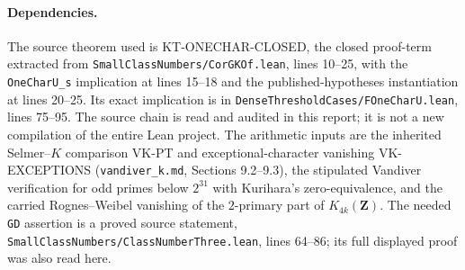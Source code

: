 \paragraph{Dependencies.}
The source theorem used is KT-ONECHAR-CLOSED, the closed
proof-term extracted from
\texttt{SmallClassNumbers/CorGKOf.lean}, lines 10--25,
with the \texttt{OneCharU\_s} implication at lines 15--18 and
the published-hypotheses instantiation at lines 20--25.
Its exact implication is in \texttt{DenseThresholdCases/FOneCharU.lean},
lines 75--95. The source chain is read and audited in this report;
it is not a new compilation of the entire Lean project.
The arithmetic inputs are the inherited Selmer--$K$ comparison
VK-PT and exceptional-character vanishing VK-EXCEPTIONS
(\texttt{vandiver\_k.md}, Sections 9.2--9.3), the stipulated
Vandiver verification for odd primes below $2^{31}$ with
Kurihara's zero-equivalence, and the carried Rognes--Weibel
vanishing of the $2$-primary part of $K_{4k}(\mathbf Z)$.
The needed \texttt{GD} assertion is a proved source statement,
\texttt{SmallClassNumbers/ClassNumberThree.lean}, lines 64--86;
its full displayed proof was also read here.
